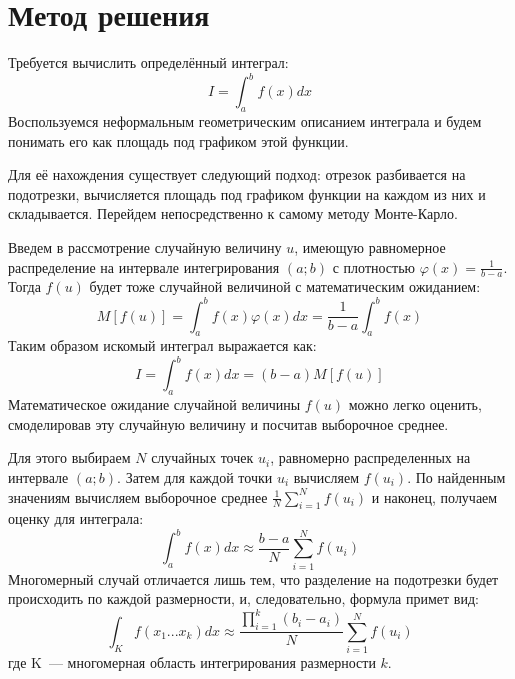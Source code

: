 \documentclass{report}
\begin{document}
\newpage

\section*{Метод решения}
Требуется вычислить определённый интеграл: \begin{equation}I = \int_{a}^{b}{f(x)dx}\end{equation}
\indent Воспользуемся неформальным геометрическим описанием интеграла и будем понимать его как площадь под графиком этой функции.
\par Для её нахождения существует следующий подход: отрезок разбивается на подотрезки, вычисляется площадь под графиком функции на каждом из них и складывается. Перейдем непосредственно к самому методу Монте-Карло.
\par Введем в рассмотрение случайную величину $u$, имеющую равномерное распределение на интервале интегрирования $(a;b)$ с плотностью $\varphi {(x)} = \frac{1}{b-a}$.
Тогда $f(u)$ будет тоже случайной величиной с математическим ожиданием: \begin{equation}M[f(u)]=\int_{a}^{b}{f(x) \varphi {(x)}dx} = \frac{1}{b-a}\int_{a}^{b}{f(x)}\end{equation}
\indent Таким образом искомый интеграл выражается как: \begin{equation}I = \int_{a}^{b}{f(x)dx} = (b-a)M[f(u)]\end{equation}
\indent Математическое ожидание случайной величины $f(u)$ можно легко оценить, смоделировав эту случайную величину и посчитав выборочное среднее.
\par Для этого выбираем $N$ случайных точек $u_{i}$, равномерно распределенных на интервале $(a;b)$. Затем для каждой точки $u_{i}$ вычисляем $f(u_{i})$. По найденным значениям вычисляем 
выборочное среднее $\frac{1}{N}\sum_{i=1}^{N}{f(u_{i})}$ и наконец, получаем оценку для интеграла: \begin{equation}\int_{a}^{b}{f(x)dx} \approx \frac{b-a}{N}\sum_{i=1}^{N}{f(u_{i})} \end{equation}
\indent Многомерный случай отличается лишь тем, что разделение на подотрезки будет происходить по каждой размерности, и, следовательно, формула примет вид:
\begin{equation}\int_{K}^{}{f(x_{1}...x_{k})dx} \approx \frac{\prod_{i=1}^{k}{(b_{i}-a_{i})}}{N}\sum_{i=1}^{N}{f(u_{i})} \end{equation}
\indent где K~--- многомерная область интегрирования размерности $k$.
\newpage
\end{document}

